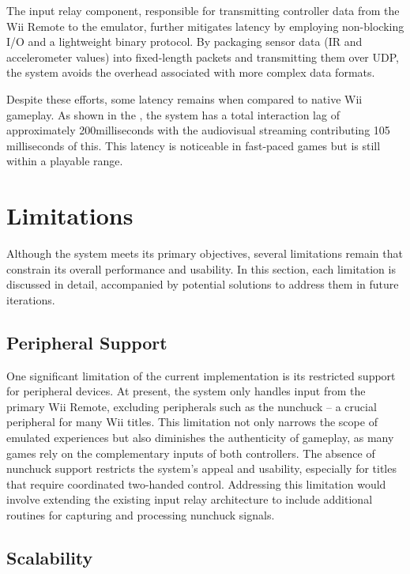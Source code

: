 The input relay component, responsible for transmitting controller data from the
Wii Remote to the emulator, further mitigates latency by employing non-blocking
I/O and a lightweight binary protocol. By packaging sensor data (IR and
accelerometer values) into fixed-length packets and transmitting them over UDP,
the system avoids the overhead associated with more complex data formats.

Despite these efforts, some latency remains when compared to native Wii
gameplay. As shown in the , the system
has a total interaction lag of approximately 200milliseconds with the audiovisual
streaming contributing 105 milliseconds of this. This latency is noticeable in
fast-paced games but is still within a playable range.

\section{Limitations}

Although the system meets its primary objectives, several limitations remain that constrain its overall performance and usability. In this section, each limitation is discussed in detail, accompanied by potential solutions to address them in future iterations.

\subsection{Peripheral Support}

One significant limitation of the current implementation is its restricted
support for peripheral devices. At present, the system only handles input from
the primary Wii Remote, excluding peripherals such as the nunchuck -- a crucial peripheral for many Wii
titles. This limitation not only narrows the scope of emulated experiences but
also diminishes the authenticity of gameplay, as many games rely on the
complementary inputs of both controllers. The absence of nunchuck support
restricts the system’s appeal and usability, especially for titles that require
coordinated two-handed control. Addressing this limitation would involve extending
the existing input relay architecture to include additional routines for
capturing and processing nunchuck signals.

\subsection{Scalability}

